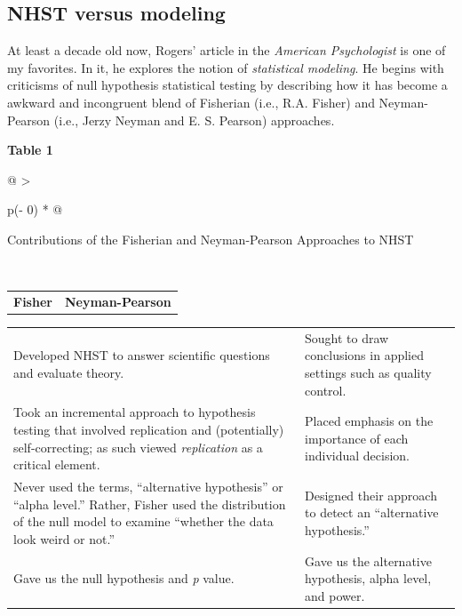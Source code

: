 \documentclass[
  11pt,
]{book}
\begin{document}
\hypertarget{nhst-versus-modeling}{%
\subsection{NHST versus modeling}\label{nhst-versus-modeling}}

At least a decade old now, Rogers' \citeyearpar{rodgers_epistemology_2010} article in the \emph{American Psychologist} is one of my favorites. In it, he explores the notion of \emph{statistical modeling}. He begins with criticisms of null hypothesis statistical testing by describing how it has become a awkward and incongruent blend of Fisherian (i.e., R.A. Fisher) and Neyman-Pearson (i.e., Jerzy Neyman and E. S. Pearson) approaches.

\textbf{Table 1}

\begin{longtable}[]{@{}
  >{\raggedright\arraybackslash}p{(\columnwidth - 0\tabcolsep) * }@{}}
\toprule\noalign{}
\begin{minipage}[b]{\linewidth}\raggedright
Contributions of the Fisherian and Neyman-Pearson Approaches to NHST \citep{rodgers_epistemology_2010}
\end{minipage} \\
\midrule\noalign{}
\endhead
\bottomrule\noalign{}
\endlastfoot
\end{longtable}

\begin{longtable}[]{@{}
  >{\centering\arraybackslash}p{}
  >{\centering\arraybackslash}p{}@{}}
\toprule\noalign{}
\endhead
\bottomrule\noalign{}
\endlastfoot
\textbf{Fisher} & \textbf{Neyman-Pearson} \\
\end{longtable}

\begin{longtable}[]{@{}
  >{\raggedright\arraybackslash}p{}
  >{\raggedright\arraybackslash}p{}@{}}
\toprule\noalign{}
\endhead
\bottomrule\noalign{}
\endlastfoot
Developed NHST to answer scientific questions and evaluate theory. & Sought to draw conclusions in applied settings such as quality control. \\
Took an incremental approach to hypothesis testing that involved replication and (potentially) self-correcting; as such viewed \emph{replication} as a critical element. & Placed emphasis on the importance of each individual decision. \\
Never used the terms, ``alternative hypothesis'' or ``alpha level.'' Rather, Fisher used the distribution of the null model to examine ``whether the data look weird or not.'' & Designed their approach to detect an ``alternative hypothesis.'' \\
Gave us the null hypothesis and \emph{p} value. & Gave us the alternative hypothesis, alpha level, and power. \\
\end{longtable}
\end{document}
